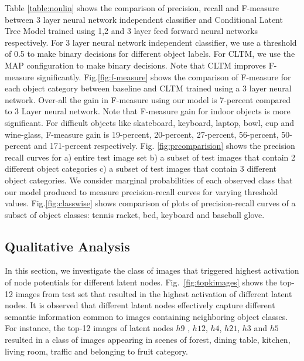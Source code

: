 \documentclass{article}
\begin{document}
Table \ref{table:nonlin} shows the comparison of precision, recall and F-measure between 3 layer neural network independent classifier and Conditional Latent Tree Model trained using 1,2 and 3 layer feed forward neural networks respectively. For 3 layer neural network independent classifier, we use a threshold of 0.5 to make binary decisions for different object labels. For CLTM, we use the MAP configuration to make binary decisions. Note that CLTM improves F-measure significantly.  Fig.\ref{fig:f-measure} shows the
comparison of F-measure for each object category between baseline and CLTM trained using a 3 layer neural network.  Over-all the gain in F-measure using our model is 7-percent compared to 3 Layer neural network. Note that F-measure gain for indoor objects is more significant. For difficult objects like skateboard, keyboard, laptop, bowl, cup and wine-glass,  F-measure gain is 19-percent, 20-percent, 27-percent, 56-percent, 50-percent and 171-percent respectively. Fig. \ref{fig:prcomparision} shows the precision recall curves for a) entire test image set b) a subset of test images that contain 2 different object categories c) a subset of test images that contain 3 different object categories. We consider marginal probabilities of each observed class that our model produced to measure precision-recall curves for varying threshold values. Fig.\ref{fig:classwise} shows comparison of plots of precision-recall curves of a subset of object classes: tennis racket, bed, keyboard and baseball glove.




\subsection{Qualitative Analysis}



In this section, we investigate the class of images that triggered highest activation of node potentials for different latent nodes. Fig.~\ref{fig:topkimages} shows the top-12  images from test set that resulted in the highest activation of different latent nodes. It is observed that different latent nodes effectively capture different semantic information common to images containing neighboring object classes. For instance, the top-12 images of latent nodes $h9$ , $h12$, $h4$, $h21$, $h3$ and $h5$ resulted in a class of images appearing in scenes of forest, dining table, kitchen, living room, traffic and  belonging to fruit category.
\end{document}
